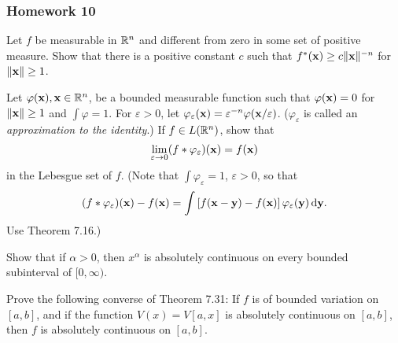 \subsubsection{Homework 10}
\setcounter{exercise}{0}
\begin{problem}
  Let $f$ be measurable in $\mathbb{R}^n$ and different from zero in some set of
  positive measure. Show that there is a positive constant $c$ such that
  $f^*(\mathbf{x})\geq c\|\mathbf{x}\|^{-n}$ for $\|\mathbf{x}\|\geq 1$.
\end{problem}
\begin{solution}
\end{solution}

\begin{problem}
  Let $\varphi(\mathbf{x}),\mathbf{x}\in\mathbb{R}^n$, be a bounded measurable function such
  that $\varphi(\mathbf{x})=0$ for $\|\mathbf{x}\|\geq 1$ and $\int\varphi=1$. For
  $\varepsilon>0$, let
  $\varphi_\varepsilon(\mathbf{x})=\varepsilon^{-n}\varphi(\mathbf{x}/\varepsilon)$.
  ($\varphi_\varepsilon$ is called an \emph{approximation to the
    identity}.) If $f\in L(\mathbb{R}^n)$, show that
  \[
    \lim_{\varepsilon\to 0}(f*\varphi_\varepsilon)(\mathbf{x})=f(\mathbf{x})
  \]
  in the Lebesgue set of $f$. (Note that $\int\varphi_\varepsilon=1$,
  $\varepsilon>0$, so that
  \[
    (f*\varphi_\varepsilon)(\mathbf{x})-f(\mathbf{x})=\int\left[f(\mathbf{x}-\mathbf{y})-f(\mathbf{x})\right]\varphi_\varepsilon(\mathbf{y})\mathop{}\!\mathrm{d}\mathbf{y}.
  \]
  Use Theorem 7.16.)
\end{problem}
\begin{solution}
\end{solution}

\begin{problem}
  Show that if $\alpha>0$, then $x^\alpha$ is absolutely continuous on
  every bounded subinterval of $[0,\infty)$.
\end{problem}
\begin{solution}
\end{solution}

\begin{problem}
  Prove the following converse of Theorem 7.31: If $f$ is of bounded
  variation on $[a,b]$, and if the function $V(x)=V[a,x]$ is absolutely
  continuous on $[a,b]$, then $f$ is absolutely continuous on $[a,b]$.
\end{problem}
\begin{solution}
\end{solution}

